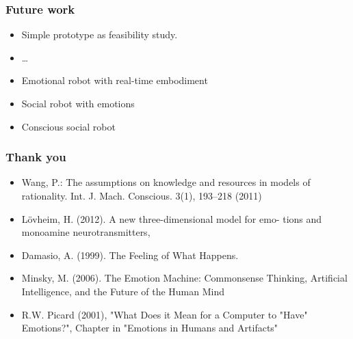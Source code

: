 \documentclass[12pt, aspectratio=169]{beamer}
\begin{document}

\begin{frame}
\frametitle{Future work}
\begin{itemize}
  \item Simple prototype as feasibility study.
  \item \ldots\
  \item Emotional robot with real-time embodiment
  \item Social robot with emotions
  \item Conscious social robot
\end{itemize}
\end{frame}



\begin{frame}

\frametitle{Thank you}

\begin{itemize}
\item Wang, P.: The assumptions on knowledge and resources in models of rationality. Int. J. Mach. Conscious. 3(1), 193–218 (2011)
\item L\"{o}vheim, H. (2012). A new three-dimensional model for emo- tions and monoamine neurotransmitters,
\item Damasio, A. (1999). The Feeling of What Happens.
\item Minsky, M. (2006). The Emotion Machine: Commonsense Thinking, Artificial Intelligence, and the Future of the Human Mind
\item R.W. Picard (2001), "What Does it Mean for a Computer to "Have" Emotions?", Chapter in "Emotions in Humans and Artifacts" 
\end{itemize}


\end{frame}

\end{document}
